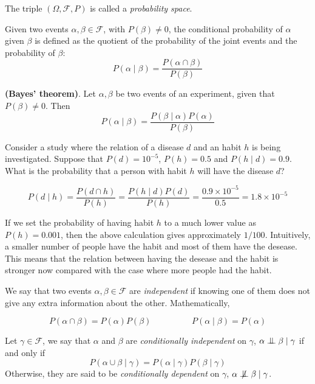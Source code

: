 The triple \((\Omega, \mathcal{F}, P)\) is called a \emph{probability space}.

\begin{definition}
  Given two events \(\alpha, \beta \in \mathcal{F}\), with \(P(\beta) \neq 0\),
  the conditional probability of \(\alpha\) given \(\beta\) is defined as the
  quotient of the probability of the joint events and the probability of
  \(\beta\):
  \[
    P(\alpha \mid \beta) = \frac{P(\alpha \cap \beta)}{P(\beta)}
  \]
\end{definition}



\begin{theorem}
  \textbf{(Bayes' theorem)}. Let \(\alpha, \beta\) be two events of an
  experiment, given that \(P(\beta) \neq 0\). Then
  \[
  P(\alpha \mid \beta)= \frac{P(\beta \mid \alpha)P(\alpha)}{P(\beta)}
\]
\end{theorem}



\begin{exampleth}
Consider a study where the relation of a disease \(d\) and an habit \(h\)
is being investigated. Suppose that \(P(d)=10^{-5}\), \(P(h)=0.5\) and \(P(h\mid d) = 0.9\). What is the
probability that a person with habit \(h\) will have the disease \(d\)?

\[
P(d \mid h) = \frac{P(d \cap h)}{P(h)} = \frac{P(h \mid d)P(d)}{P(h)} =
\frac{ 0.9 \times 10^{-5}}{ 0.5 } = 1.8 \times 10^{-5}
\]

If we set the probability of having habit \(h\) to a much lower value as \(P(h) =
0.001\), then the above calculation gives approximately \(1/100\). Intuitively, a smaller number of people have the habit and most of them have the
desease. This means that the relation between having the desease and the habit
is stronger now compared with the case where more people had the habit.
\end{exampleth}

\begin{definition}
  We say that two events \(\alpha, \beta \in \mathcal{F}\) are
  \emph{independent} if knowing one of them does not give any extra information
  about the other. Mathematically,

  \[
    P(\alpha \cap \beta) = P(\alpha)P(\beta) \hspace{2cm} P(\alpha \mid \beta) = P(\alpha)
  \]

  Let \(\gamma \in \mathcal{F}\), we say that \(\alpha\) and \(\beta\) are
  \emph{conditionally independent} on \(\gamma\), \(\alpha \bigCI \beta \mid \gamma\)
  if and only if
  \[
    P(\alpha \cup \beta \mid \gamma) = P(\alpha \mid \gamma)P(\beta \mid \gamma)
  \]
  Otherwise, they are said to be \emph{conditionally dependent} on \(\gamma\),  \(\alpha \bigCD \beta \mid \gamma\).

\end{definition}

